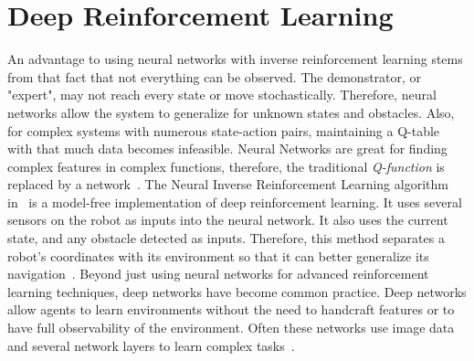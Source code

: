 \documentclass[12pt,american]{report}
\begin{document}
\chapter{Deep Reinforcement Learning}
An advantage to using neural networks with inverse reinforcement learning stems from that fact that not everything can be observed. The demonstrator, or "expert", may not reach every state or move stochastically. Therefore, neural networks allow the system to generalize for unknown states and obstacles. Also, for complex systems with numerous state-action pairs, maintaining a Q-table with that much data becomes infeasible. Neural Networks are great for finding complex features in complex functions, therefore, the traditional \textit{Q-function} is replaced by a network~\cite{matiisen_2015}. The Neural Inverse Reinforcement Learning algorithm in~\cite{xia2016neural} is a model-free implementation of deep reinforcement learning. It uses several sensors on the robot as inputs into the neural network.  It also uses the current state, and any obstacle detected as inputs. Therefore, this method separates a robot's coordinates with its environment so that it can better generalize its navigation~\cite{xia2016neural}. Beyond just using neural networks for advanced reinforcement learning techniques, deep networks have become common practice. Deep networks allow agents to learn environments without the need to handcraft features or to have full observability of the environment. Often these networks use image data and several network layers to learn complex tasks~\cite{atari}.
\end{document}
